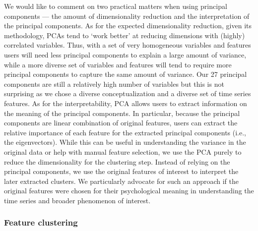 We would like to comment on two practical matters when using principal
components --- the amount of dimensionality reduction and the
interpretation of the principal components. As for the expected
dimensionality reduction, given its methodology, PCAs tend to `work
better' at reducing dimensions with (highly) correlated variables. Thus,
with a set of very homogeneous variables and features users will need
less principal components to explain a large amount of variance, while a
more diverse set of variables and features will tend to require more
principal components to capture the same amount of variance. Our 27
principal components are still a relatively high number of variables but
this is not surprising as we chose a diverse conceptualization and a
diverse set of time series features. As for the interpretability, PCA
allows users to extract information on the meaning of the principal
components. In particular, because the principal components are linear
combination of original features, users can extract the relative
importance of each feature for the extracted principal components (i.e.,
the eigenvectors). While this can be useful in understanding the
variance in the original data or help with manual feature selection, we
use the PCA purely to reduce the dimensionality for the clustering step.
Instead of relying on the principal components, we use the original
features of interest to interpret the later extracted clusters. We
particularly advocate for such an approach if the original features were
chosen for their psychological meaning in understanding the time series
and broader phenomenon of interest.

\subsubsection{Feature clustering}


